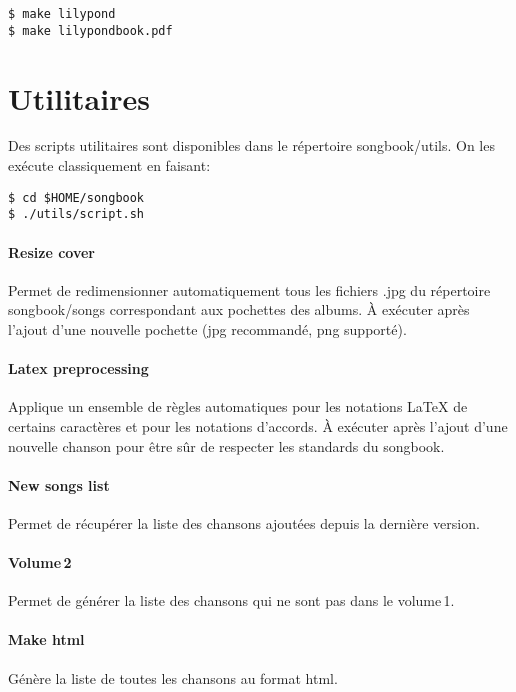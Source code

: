 \documentclass[a4paper]{article}
\begin{document}
\begin{verbatim}
$ make lilypond
$ make lilypondbook.pdf 
\end{verbatim}


\section{Utilitaires}\label{sect:utilitaires}

Des scripts utilitaires sont disponibles dans le répertoire
songbook/utils. On les exécute classiquement en faisant:

\begin{verbatim}
$ cd $HOME/songbook
$ ./utils/script.sh
\end{verbatim}

\paragraph{Resize cover}
Permet de redimensionner automatiquement tous les fichiers .jpg du
répertoire songbook/songs correspondant aux pochettes des albums. À
exécuter après l'ajout d'une nouvelle pochette (jpg recommandé, png
supporté).

\paragraph{Latex preprocessing}
Applique un ensemble de règles automatiques pour les notations \LaTeX
de certains caractères et pour les notations d'accords.
À exécuter après l'ajout d'une nouvelle chanson pour être sûr de
respecter les standards du songbook.

\paragraph{New songs list}
Permet de récupérer la liste des chansons ajoutées depuis la dernière
version.

\paragraph{Volume\,2}
Permet de générer la liste des chansons qui ne sont pas dans le volume\,1.

\paragraph{Make html}
Génère la liste de toutes les chansons au format html.
\end{document}
